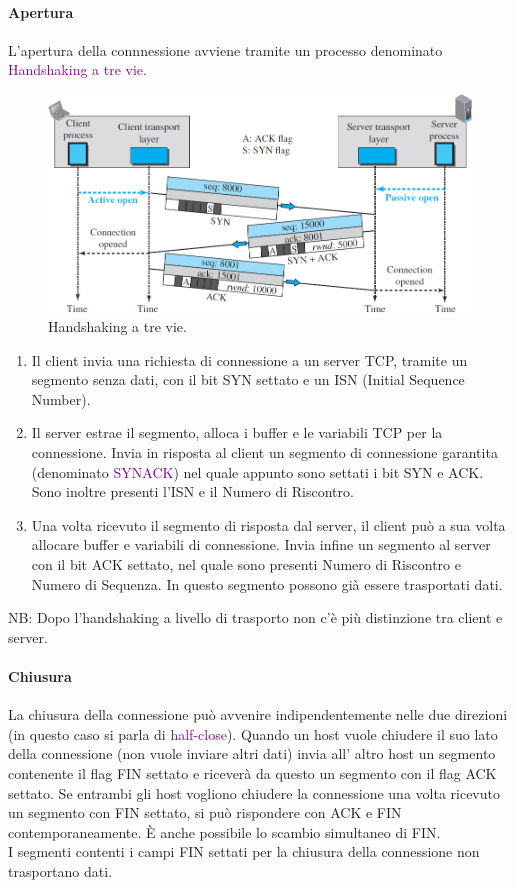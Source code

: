 \paragraph{Apertura} L'apertura della connnessione avviene tramite un processo denominato \textcolor{purple}{Handshaking a tre vie}.
\begin{figure}[h]
    \centering
    \includegraphics[scale=0.37]{Immagini/HandShakingTreVieTCP.png}
    \caption{Handshaking a tre vie.}
\end{figure}
\begin{enumerate}
    \item Il client invia una richiesta di connessione a un server TCP, tramite un segmento senza dati, con il bit SYN settato e un ISN (Initial Sequence Number).
    \item Il server estrae il segmento, alloca i buffer e le variabili TCP per la connessione.
    Invia in risposta al client un segmento di connessione garantita (denominato \textcolor{purple}{SYNACK}) nel quale appunto sono settati i bit SYN e ACK. Sono inoltre presenti l'ISN e il Numero di Riscontro. 
    \item Una volta ricevuto il segmento di risposta dal server, il client può a sua volta allocare buffer e variabili di connessione. Invia infine un segmento al server con il bit ACK settato, nel quale sono presenti Numero di Riscontro e Numero di Sequenza. In questo segmento possono già essere trasportati dati.
\end{enumerate}

NB: Dopo l'handshaking a livello di trasporto non c'è più distinzione tra client e server.

\paragraph{Chiusura} La chiusura della connessione può avvenire indipendentemente nelle due direzioni (in questo caso si parla di \textcolor{purple}{half-close}). Quando un host vuole chiudere il suo lato della connessione (non vuole inviare altri dati) invia all' altro host un segmento contenente il flag FIN settato e riceverà da questo un segmento con il flag ACK settato.
Se entrambi gli host vogliono chiudere la connessione una volta ricevuto un segmento con FIN settato, si può rispondere con ACK e FIN contemporaneamente. È anche possibile lo scambio simultaneo di FIN.
\\I segmenti contenti i campi FIN settati per la chiusura della connessione non trasportano dati.


